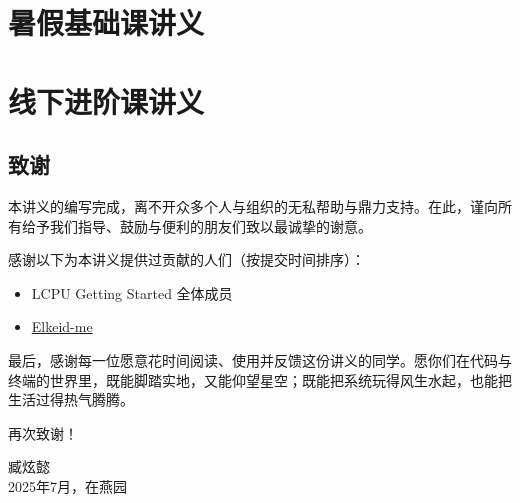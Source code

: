 \documentclass[12pt, openany]{ctexbook}
\begin{document}
\tableofcontents


\part{暑假基础课讲义}







\part{线下进阶课讲义}









\backmatter

\chapter{致谢}

本讲义的编写完成，离不开众多个人与组织的无私帮助与鼎力支持。在此，谨向所有给予我们指导、鼓励与便利的朋友们致以最诚挚的谢意。

感谢以下为本讲义提供过贡献的人们（按提交时间排序）：

\begin{itemize}
  \item LCPU Getting Started 全体成员
  \item \faGithub\href{https://github.com/Elkeid-me}{Elkeid-me}
\end{itemize}

最后，感谢每一位愿意花时间阅读、使用并反馈这份讲义的同学。愿你们在代码与终端的世界里，既能脚踏实地，又能仰望星空；既能把系统玩得风生水起，也能把生活过得热气腾腾。

再次致谢！

\vspace{2em}
\begin{flushright}
  臧炫懿 \\
  2025年7月，在燕园
\end{flushright}
\end{document}
